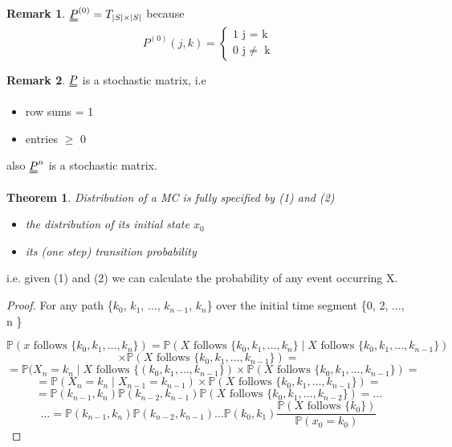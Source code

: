 \documentclass{article}
\newtheorem*{thm}{Theorem}
\theoremstyle{definition}
\newtheorem*{rem}{Remark}
\begin{document}
\begin{rem} $\uuline{P}^{(0)} = T_{\mid S \mid \times \mid S \mid}$ because
\[
P^{(0)}(j,k) = \begin{cases} 1 \mbox{ j = k}\\ 0 \mbox{ j} \neq \mbox{ k} \end{cases}
\]
\end{rem}

\begin{rem} $\uuline{P}$ is a stochastic matrix, i.e
\begin{itemize}
\item
row sums = 1
\item
entries $\geq$ 0
\end{itemize}
also $\uuline{P}^n$ is a stochastic matrix.
\end{rem}

\begin{thm} Distribution of a MC is fully specified by (1) and (2)
\begin{itemize}
\item
the distribution of its initial state $x_0$
\item
its (one step) transition probability
\end{itemize}
\end{thm}

i.e. given (1) and (2) we can calculate the probability of any event occurring X.

\begin{proof} For any path \{$k_0$, $k_1$, $\ldots$, $k_{n-1}$, $k_n$\} over the initial time segment \{0, 2, $\ldots$, n \}

\[
\mathbb{P}(x \mbox{ follows } \{k_0, k_1, \ldots, k_n \}) = \mathbb{P}(X \mbox{ follows } \{k_0, k_1, \ldots, k_n \} \mid X \mbox{ follows } \{k_0, k_1, \ldots, k_{n-1} \}) 
\]
\[
\times \mathbb{P}(X \mbox{ follows } \{k_0, k_1, \ldots, k_{n-1} \}) =
\]
\[
= \mathbb{P}(X_n = k_n \mid X \mbox{ follows } \{(k_0, k_1, \ldots, k_{n-1} \}) \times \mathbb{P}(X \mbox{ follows } \{ k_0, k_1, \ldots, k_{n-1} \} ) =
\]
\[ = \mathbb{P}(X_n = k_n \mid X_{n-1} = k_{n-1} ) \times \mathbb{P}(X \mbox{ follows } \{k_0, k_1, \ldots, k_{n-1} \}) =
\]
\[
= \mathbb{P}(k_{n-1}, k_{n} ) \mathbb{P}(k_{n-2}, k_{n-1}) \mathbb{P}(X \mbox{ follows } \{ k_0, k_1, \ldots, k_{n-2} \}) = \ldots
\]
\[
\ldots = \mathbb{P}(k_{n-1}, k_{n} ) \mathbb{P}(k_{n-2}, k_{n-1}) \ldots \mathbb{P}(k_0, k_1) \frac{\mathbb{P}(X \mbox{ follows } \{k_0\})}{\mathbb{P} (x_0 = k_0)}
\]
\end{proof}
\end{document}

